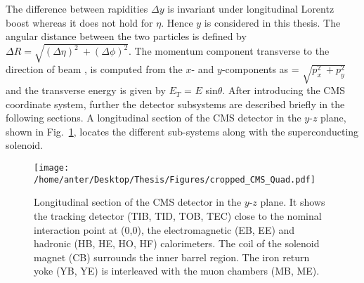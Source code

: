 The difference between rapidities $\Delta y$ is invariant under longitudinal Lorentz boost whereas it does not hold for $\eta$. Hence $y$ is considered in this thesis. The angular distance between the two particles is defined by $\Delta R = \sqrt{(\Delta \eta)^2~\plus (\Delta \phi)^2}$. The momentum component transverse to the direction of beam \pt, is computed from the $x$- and $y$-components as \pt = $\sqrt{p^2_x~\plus p^2_y}$ and the transverse energy is given by $E_T$ = $E$ sin$\theta$. After introducing the CMS coordinate system, further the detector subsystems are described briefly in the following sections. A longitudinal section of the CMS detector in the $y$-$z$ plane, shown in Fig.~\ref{fig:CMS_quad}, locates the different sub-systems along with the superconducting solenoid.

\begin{figure}[!h]
\vspace*{2mm}
\begin{center} 
\hspace*{-5mm}
\texttt{[image: /home/anter/Desktop/Thesis/Figures/cropped\_CMS\_Quad.pdf]}
\vspace{3mm}
\caption[Longitudinal section of the CMS detector in the $y$-$z$ plane.]{Longitudinal section of the CMS detector in the $y$-$z$ plane\footnotemark. It shows the tracking detector (TIB, TID, TOB, TEC) close to the nominal interaction point at (0,0), the electromagnetic (EB, EE) and hadronic (HB, HE, HO, HF) calorimeters. The coil of the solenoid magnet (CB) surrounds the inner barrel region. The iron return yoke (YB, YE) is interleaved with the muon chambers (MB, ME).}
\label{fig:CMS_quad}
\end{center}
\end{figure}

